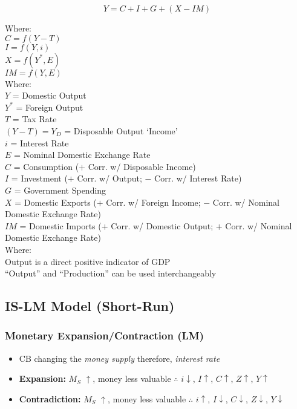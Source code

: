 \documentclass[11pt, english]{article}
\begin{document}
	$$Y=C+I+G+(X-IM)$$

        Where:\\
        $C=f(Y-T)$\\
        $I=f(Y,i)$\\
        $X=f(Y^*,E)$\\
        $IM=f(Y,E)$\\

        Where:\\
        $Y$ = Domestic Output\\
        $Y^*$ = Foreign Output\\
        $T$ = Tax Rate\\
        $(Y-T)=Y_D$ = Disposable Output `Income'\\
        $i$ = Interest Rate\\
        $E$ = Nominal Domestic Exchange Rate\\
        $C$ = Consumption ($+$ Corr. w/ Disposable Income)\\
        $I$ = Investment ($+$ Corr. w/ Output; $-$ Corr. w/ Interest Rate)\\
        $G$ = Government Spending\\
        $X$ = Domestic Exports ($+$ Corr. w/ Foreign Income; $-$ Corr. w/ Nominal Domestic Exchange Rate)\\
        $IM$ = Domestic Imports ($+$ Corr. w/ Domestic Output; $+$ Corr. w/ Nominal Domestic Exchange Rate)\\

        Where:\\
        Output is a direct positive indicator of GDP\\
        ``Output'' and ``Production'' can be used interchangeably\\

	\newpage

	\subsection{IS-LM Model (Short-Run)}

		\subsubsection{Monetary Expansion/Contraction (LM)}

	\begin{itemize}
	\setlength\itemsep{0cm}
		\item CB changing the \textit{money supply} therefore, \textit{interest rate}
		\item \textbf{Expansion:} $M_S$ $\uparrow$, money less valuable $\therefore$ $i\downarrow$, $I\uparrow$, $C\uparrow$, $Z\uparrow$, $Y\uparrow$
		\item \textbf{Contradiction:} $M_S$ $\uparrow$, money less valuable $\therefore$ $i\uparrow$, $I\downarrow$, $C\downarrow$, $Z\downarrow$, $Y\downarrow$
	\end{itemize}
\end{document}
